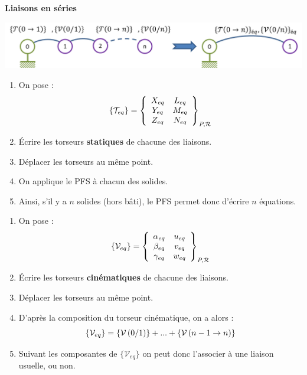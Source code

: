 \documentclass[10pt]{article}
\begin{document}
\begin{methode}
\textbf{Liaisons en séries}

\begin{center}
\includegraphics[width=.6\textwidth]{images/serie}
\end{center}

\begin{minipage}[t]{.47\linewidth}
\noindent\colorbox{rougef}{\makebox[\textwidth][l]{%
\textbf{\textsf{\textcolor{white}{Méthode statique}}}
}}
\begin{enumerate}
\item On pose : 
$$
\{\mathcal{T}_{eq}\}=\torseurcol{X_{eq}}{Y_{eq}}{Z_{eq}}{L_{eq}}{M_{eq}}{N_{eq}}{P,\mathcal{R}}
$$
\item Écrire les torseurs \textbf{statiques} de chacune des liaisons.
\item Déplacer les torseurs au même point.
\item On applique le PFS à chacun des solides.
\item Ainsi, s'il y a $n$ solides (hors bâti), le PFS permet donc d'écrire $n$ équations.
\end{enumerate}
\end{minipage}\hfill
\begin{minipage}[t]{.47\linewidth}
\noindent\colorbox{rougef}{\makebox[\textwidth][l]{%
\textbf{\textsf{\textcolor{white}{Méthode cinématique}}}
}}
\begin{enumerate}
\item On pose : 
$$
\{\mathcal{V}_{eq}\}=\torseurcol{\alpha_{eq}}{\beta_{eq}}{\gamma_{eq}}{u_{eq}}{v_{eq}}{w_{eq}}{P,\mathcal{R}}
$$
\item Écrire les torseurs \textbf{cinématiques} de chacune des liaisons.
\item Déplacer les torseurs au même point.
\item D'après la composition du torseur cinématique, on a alors : 
$$
\{\mathcal{V}_{eq} \}=\torseurcin{V}{0}{1}+...
+\torseurstat{V}{n-1}{n}
$$
\item Suivant les composantes de $\{\mathcal{V}_{eq}\}$ on peut donc l'associer à une liaison usuelle, ou non.
\end{enumerate}
\end{minipage}
\end{methode}
\end{document}
